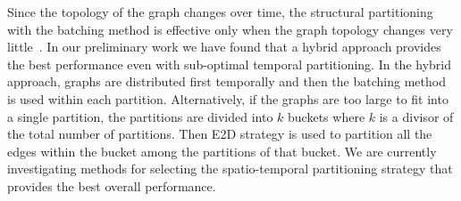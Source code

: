 Since the topology of the graph changes over time, the structural
partitioning with the batching method is effective only when the graph
topology changes very little~\cite{MoffittTempWeb16}.  In our
preliminary work we have found that a hybrid approach provides the
best performance even with sub-optimal temporal partitioning.  In the
hybrid approach, graphs are distributed first temporally and then the
batching method is used within each partition.  Alternatively, if the
graphs are too large to fit into a single partition, the partitions
are divided into $k$ buckets where $k$ is a divisor of the total
number of partitions.  Then E2D strategy is used to partition all the
edges within the bucket among the partitions of that bucket.  We are
currently investigating methods for selecting the spatio-temporal
partitioning strategy that provides the best overall performance.
